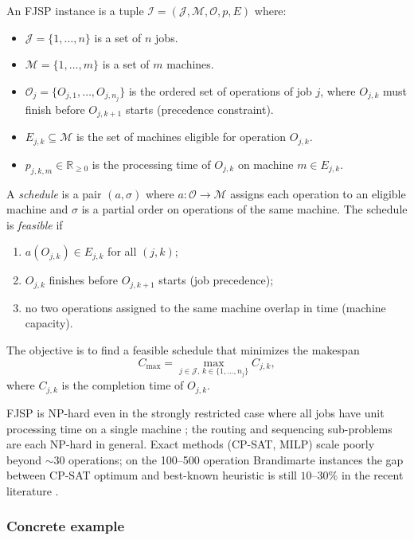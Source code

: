 \documentclass[10pt]{article}
\theoremstyle{definition}
\newcommand{\reals}{\mathbb{R}}
\newcommand{\Rplus}{\reals_{\geq 0}}
\begin{document}
An FJSP instance is a tuple $\mathcal{I} = (\mathcal{J}, \mathcal{M},
\mathcal{O}, p, E)$ where:
\begin{itemize}
  \item $\mathcal{J} = \{1, \dots, n\}$ is a set of $n$ jobs.
  \item $\mathcal{M} = \{1, \dots, m\}$ is a set of $m$ machines.
  \item $\mathcal{O}_{j} = \{O_{j,1}, \dots, O_{j,n_j}\}$ is the
        ordered set of operations of job $j$, where $O_{j,k}$ must
        finish before $O_{j,k+1}$ starts (precedence constraint).
  \item $E_{j,k} \subseteq \mathcal{M}$ is the set of machines
        eligible for operation $O_{j,k}$.
  \item $p_{j,k,m} \in \Rplus$ is the processing time of $O_{j,k}$
        on machine $m \in E_{j,k}$.
\end{itemize}

A \emph{schedule} is a pair $(a, \sigma)$ where
$a : \mathcal{O} \to \mathcal{M}$ assigns each operation
to an eligible machine and $\sigma$ is a partial order
on operations of the same machine. The schedule is
\emph{feasible} if
\begin{enumerate}
  \item $a(O_{j,k}) \in E_{j,k}$ for all $(j,k)$;
  \item $O_{j,k}$ finishes before $O_{j,k+1}$ starts
        (job precedence);
  \item no two operations assigned to the same machine
        overlap in time (machine capacity).
\end{enumerate}
The objective is to find a feasible schedule that minimizes
the makespan
\begin{equation}
  C_{\max} = \max_{j \in \mathcal{J}, \, k \in \{1, \dots, n_j\}}
  C_{j,k},
  \label{eq:makespan}
\end{equation}
where $C_{j,k}$ is the completion time of $O_{j,k}$.

FJSP is NP-hard even in the strongly restricted case where
all jobs have unit processing time on a single machine
\citep{Garey1976}; the routing and sequencing sub-problems
are each NP-hard in general. Exact methods (CP-SAT, MILP)
scale poorly beyond $\sim\!30$ operations; on the 100--500
operation Brandimarte instances the gap between CP-SAT
optimum and best-known heuristic is still
$10\text{--}30\%$ in the recent literature
\citep{Song2022TII, Lei2022}.

\subsubsection{Concrete example}
\end{document}
